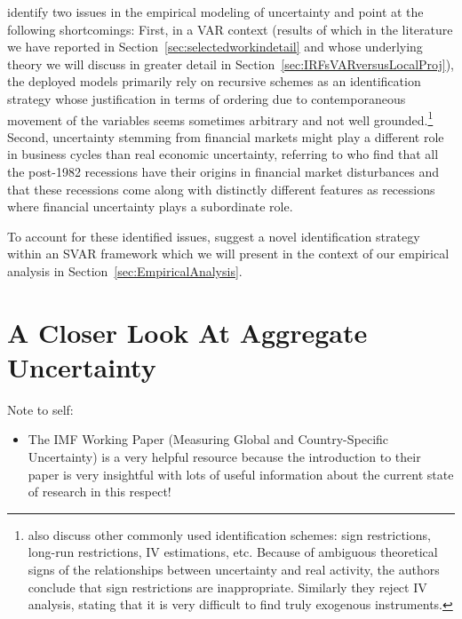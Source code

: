 \documentclass[a4paper,11pt,listof=nochaptergap,oneside,pointednumbers,bibtotoc,bigheadings,liststotoc]{scrbook}
\theoremstyle{mysatz}
\theoremstyle{mydefinition}
\theoremstyle{mybemerkung}
\begin{document}
\citet{ludvigsonetal:18} identify two issues in the empirical modeling of uncertainty and point at the following shortcomings: First, in a VAR context (results of which in the literature we have reported in Section~\ref{sec:selectedworkindetail} and whose underlying theory we will discuss in greater detail in Section~\ref{sec:IRFsVARversusLocalProj}), the deployed models primarily rely on recursive schemes as an identification strategy whose justification in terms of ordering due to contemporaneous movement of the variables seems sometimes arbitrary and not well grounded.\footnote{\citet{ludvigsonetal:18} also discuss other commonly used identification schemes: sign restrictions, long-run restrictions, IV estimations, etc. Because of ambiguous theoretical signs of the relationships between uncertainty and real activity, the authors conclude that sign restrictions are inappropriate. Similarly they reject IV analysis, stating that it is very difficult to find truly exogenous instruments.} Second, uncertainty stemming from financial markets might play a different role in business cycles than real economic uncertainty, referring to \citet{ngandwright:13} who find that all the post-1982 recessions have their origins in financial market disturbances and that these recessions come along with distinctly different features as recessions where financial uncertainty plays a subordinate role.

To account for these identified issues, \citet{ludvigsonetal:18} suggest a novel identification strategy within an SVAR framework which we will present in the context of our empirical analysis in Section~\ref{sec:EmpiricalAnalysis}.

\chapter{A Closer Look At Aggregate Uncertainty}
\label{MeasuringUncertaintyandaHistoricalView}

\begingroup
    \fontsize{8pt}{12pt}\selectfont
    Note to self:
\begin{itemize}
	\item  The IMF Working Paper (Measuring Global and Country-Specific Uncertainty) is a very helpful resource because the introduction to their paper is very insightful with lots of useful information about the current state of research in this respect!
\end{itemize}
\endgroup
\end{document}
